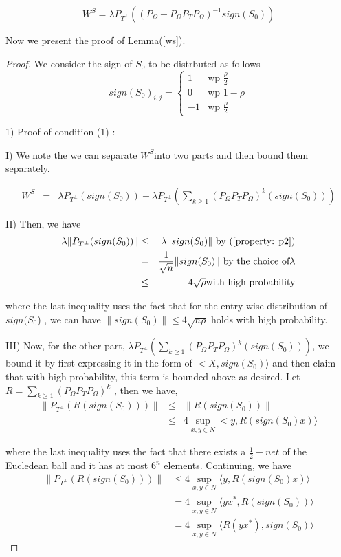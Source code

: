 \[
W^{S}=\lambda P_{T^{\bot}}((P_{\Omega}-P_{\Omega}P_{T}P_{\Omega})^{-1}sign(S_{0}))
\]

Now we present the proof of Lemma(\ref{ws}). 
\begin{proof}
We consider the sign of $S_{0}$ to be distrbuted as follows
\[
sign(S_{0})_{i,j}=\begin{cases}
1 & \text{wp }\frac{\rho}{2}\\
0 & \text{wp }1-\rho\\
-1 & \text{wp }\frac{\rho}{2}
\end{cases}
\]


1) Proof of condition (1) :

I) We note the we can separate $W^{S}$into two parts and then bound them separately.

\begin{eqnarray*}
W^{S} & = & \lambda P_{T^{\bot}}(sign(S_{0}))+\lambda P_{T^{\bot}}(\sum_{k\ge1}(P_{\Omega}P_{T}P_{\Omega})^{k}(sign(S_{0})))
\end{eqnarray*}


II) Then, we have
\begin{eqnarray*}
\lambda \| P_{T^{\bot}}(sign(S_{0})) \| & \le & \lambda\|sign(S_{0})\| \text{ by (\ref{property: p2})}\\
 & = & \frac{1}{\sqrt{n}}\|sign(S_{0})\| \text{ by the choice of}  \lambda\\
 & \le & 4\sqrt{\rho}\text{with high probability}
\end{eqnarray*}


where the last inequality uses the fact that for the entry-wise distribution of $sign(S_{0}$) , we can have $\|sign(S_{0})\|\le4\sqrt{n\rho}$ holds with high probability.

III) Now, for the other part, $\lambda P_{T^{\bot}}(\sum_{k\ge1}(P_{\Omega}P_{T}P_{\Omega})^{k}(sign(S_{0})))$, we bound it by first expressing it in the form of $<X,sign(S_{0})\rangle$ and then claim that with high probability, this term is bounded above as desired. Let $R=\sum_{k\ge1}(P_{\Omega}P_{T}P_{\Omega})^{k}$ ,
then we have,
\begin{eqnarray*}
\|P_{T^{\bot}}(R(sign(S_{0})))\| & \le & \|R(sign(S_{0}))\|\\
 & \le & 4\sup_{x,y\in N}<y,R(sign(S_{0})x)\rangle
\end{eqnarray*}


where the last inequality uses the fact that there exists a $\frac{1}{2}-net$ of the Eucledean ball and it has at most $6^{n}$ elements. Continuing, we have
\begin{align} 
\|P_{T^{\bot}}(R(sign(S_{0})))\| 
& \le 4\sup_{x,y \in N} \langle y,R(sign(S_{0})x) \rangle \nonumber \\
& = 4\sup_{x,y \in N} \langle yx^{*},R(sign(S_{0})) \rangle \nonumber \\
& = 4\sup_{x,y \in N} \langle R(yx^{*}),sign(S_{0}) \rangle 
\label{net}
\end{align}



\end{proof}
